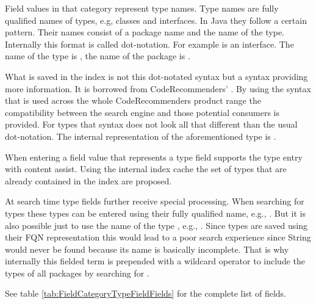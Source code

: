 Field values in that category represent type names. 
Type names are fully qualified names of types, e.g, classes and interfaces. 
In Java they follow a certain pattern. Their names consist of a package name and the name of the type. 
Internally this format is called dot-notation. For example  is an interface. 
The name of the type is , the name of the package is .

What is saved in the index is not this dot-notated syntax but a syntax providing more information. It is borrowed from CodeRecommenders' . 
By using the syntax that is used across the whole CodeRecommenders product range the compatibility between the search engine and those potential consumers is provided. 
For types that syntax does not look all that different than the usual dot-notation. The internal representation of the aforementioned type  is .

When entering a field value that represents a type field \cname supports the type entry with content assist. 
Using the internal index cache the set of types that are already contained in the index are proposed.

At search time type fields further receive special processing. When searching for types these types can be entered using their fully qualified name, e.g., .
But it is also possible just to use the name of the type , e.g., . 
Since types are saved using their FQN representation this would lead to a poor search experience since String would never be found because its name is basically incomplete. 
That is why internally this fielded term is prepended with a wildcard operator to include the types  of all packages by searching for .

See table \ref{tab:FieldCategoryTypeFieldFields} for the complete list of fields.

